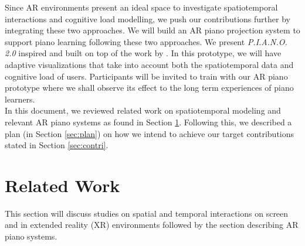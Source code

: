 \documentclass[manuscript,screen]{acmart}
\begin{document}

Since AR environments present an ideal space to investigate spatiotemporal interactions and cognitive load modelling, we push our contributions further by integrating these two approaches. We will build an AR piano projection system to support piano learning following these two approaches. We present \textit{P.I.A.N.O. 2.0} inspired and built on top of the work by \citet{rogers2014piano}. In this prototype, we will have adaptive visualizations that take into account both the spatiotemporal data and cognitive load of users. Participants will be invited to train with our AR piano prototype where we shall observe its effect to the long term experiences of piano learners.\\

In this document, we reviewed related work on spatiotemporal modeling and relevant AR piano systems as found in Section \ref{sec:rrl}. Following this, we described a plan (in Section \ref{sec:plan}) on how we intend to achieve our target contributions stated in Section \ref{sec:contri}. \\



\section{Related Work}
\label{sec:rrl}
This section will discuss studies on spatial and temporal interactions on screen and in extended reality (XR) environments followed by the section describing AR piano systems. 
\end{document}
